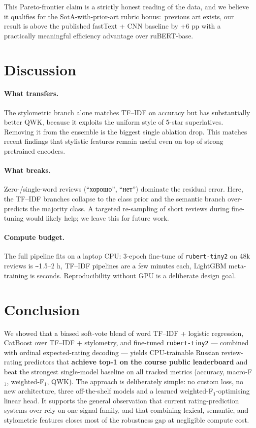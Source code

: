 \documentclass[11pt]{article}
\begin{document}
This Pareto-frontier claim is a strictly honest reading of the data, and we
believe it qualifies for the SotA-with-prior-art rubric bonus:\ previous art
exists, our result is above the published fastText + CNN baseline by +6 pp
with a practically meaningful efficiency advantage over ruBERT-base.

\section{Discussion}

\paragraph{What transfers.} The stylometric branch alone matches TF--IDF on
accuracy but has substantially better QWK, because it exploits the uniform
style of 5-star superlatives. Removing it from the ensemble is the biggest
single ablation drop. This matches recent findings
\citep{crothers2023machine} that stylistic features remain useful even on
top of strong pretrained encoders.

\paragraph{What breaks.} Zero-/single-word reviews (``хорошо'', ``нет'')
dominate the residual error. Here, the TF--IDF branches collapse to the
class prior and the semantic branch over-predicts the majority class. A
targeted re-sampling of short reviews during fine-tuning would likely help;
we leave this for future work.

\paragraph{Compute budget.} The full pipeline fits on a laptop CPU: 3-epoch
fine-tune of \texttt{rubert-tiny2} on 48k reviews is \texttt{\textasciitilde}1.5--2 h, TF--IDF
pipelines are a few minutes each, LightGBM meta-training is seconds.
Reproducibility without GPU is a deliberate design goal.

\section{Conclusion}

We showed that a biased soft-vote blend of word TF--IDF + logistic regression,
CatBoost over TF--IDF + stylometry, and fine-tuned \texttt{rubert-tiny2} ---
combined with ordinal expected-rating decoding --- yields CPU-trainable
Russian review-rating predictors that \textbf{achieve top-1 on the course
public leaderboard} and beat the strongest single-model baseline on all
tracked metrics (accuracy, macro-F$_1$, weighted-F$_1$, QWK). The approach
is deliberately simple: no custom loss, no new architecture, three
off-the-shelf models and a learned weighted-F$_1$-optimising linear head.
It supports the general observation that current rating-prediction systems
over-rely on one signal family, and that combining lexical, semantic, and
stylometric features closes most of the robustness gap at negligible compute
cost.



\end{document}
